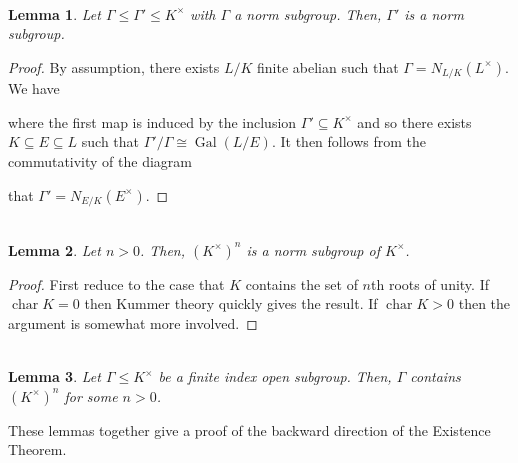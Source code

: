 \documentclass[11pt]{article}
\newcommand{\iso}{\cong}
\DeclareMathOperator{\ch}{char}
\DeclareMathOperator{\Gal}{Gal}
\renewcommand{\subset}{\subseteq}
\newtheorem*{lemma*}{\\Lemma}
\begin{document}
\begin{lemma*}
Let $\Gamma\leq\Gamma'\leq K^{\times}$ with $\Gamma$ a norm subgroup. Then, $\Gamma'$ is a norm subgroup.
\end{lemma*}
\begin{proof}
By assumption, there exists $L/K$ finite abelian such that $\Gamma=N_{L/K}(L^{\times})$. We have
\begin{center}
\end{center}
where the first map is induced by the inclusion $\Gamma'\subset K^{\times}$ and so there exists $K\subset E\subset L$ such that $\Gamma'/\Gamma\iso\Gal(L/E)$. It then follows from the commutativity of the diagram
\begin{center}
\end{center}
that $\Gamma'=N_{E/K}(E^{\times})$.
\end{proof}

\begin{lemma*}
Let $n>0$. Then, $(K^{\times})^n$ is a norm subgroup of $K^{\times}$.
\end{lemma*}
\begin{proof}
First reduce to the case that $K$ contains the set of $n$th roots of unity. If $\ch K=0$ then Kummer theory quickly gives the result. If $\ch K>0$ then the argument is somewhat more involved.
\end{proof}

\begin{lemma*}
Let $\Gamma\leq K^{\times}$ be a finite index open subgroup. Then, $\Gamma$ contains $(K^{\times})^n$ for some $n>0$.
\end{lemma*}

These lemmas together give a proof of the backward direction of the Existence Theorem.
\end{document}
